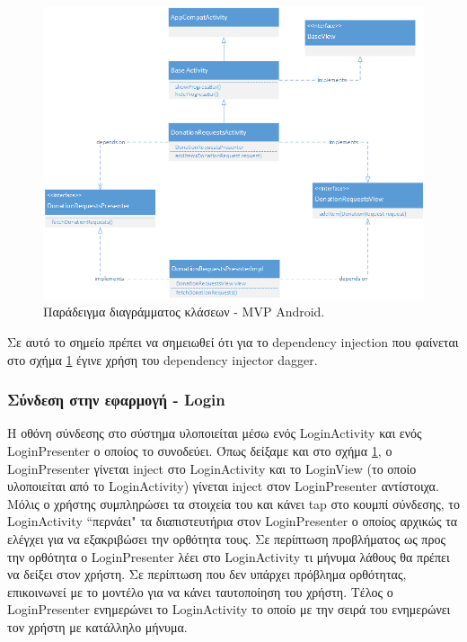 	\begin{figure}[h]
	    \centering
	    \includegraphics[width=1.1\textwidth]{android_mvp_example_class_diagram.png}
	    \caption{Παράδειγμα διαγράμματος κλάσεων - MVP Android.}
	    \label{fig:android_mvp_example_class_diagram}
	\end{figure}
	
	Σε αυτό το σημείο πρέπει να σημειωθεί ότι για το dependency injection που φαίνεται στο σχήμα \ref{fig:android_mvp_example_class_diagram} έγινε χρήση του dependency injector dagger\cite{daggerAndroid}. 
	
   		\subsubsection{Σύνδεση στην εφαρμογή - Login}
   		
   		Η οθόνη σύνδεσης στο σύστημα υλοποιείται μέσω ενός LoginActivity και ενός LoginPresenter ο οποίος το συνοδεύει. Όπως δείξαμε και στο σχήμα \ref{fig:android_mvp_example_class_diagram}, ο LoginPresenter γίνεται inject στο LoginActivity και το LoginView (το οποίο υλοποιείται από το LoginActivity) γίνεται inject στον LoginPresenter αντίστοιχα. Μόλις ο χρήστης συμπληρώσει τα στοιχεία του και κάνει tap στο κουμπί σύνδεσης, το LoginActivity ``περνάει" τα διαπιστευτήρια στον LoginPresenter ο οποίος αρχικώς τα ελέγχει για να εξακριβώσει την ορθότητα τους. Σε περίπτωση προβλήματος ως προς την ορθότητα ο LoginPresenter λέει στο LoginActivity τι μήνυμα λάθους θα πρέπει να δείξει στον χρήστη. Σε περίπτωση που δεν υπάρχει πρόβλημα ορθότητας, επικοινωνεί με το μοντέλο για να κάνει ταυτοποίηση του χρήστη. Τέλος ο LoginPresenter ενημερώνει το LoginActivity το οποίο με την σειρά του ενημερώνει τον χρήστη με κατάλληλο μήνυμα. 
   		
